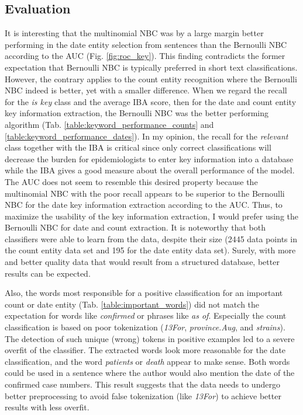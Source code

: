 \subsection{Evaluation}\label{eval_key}
  It is interesting that the multinomial NBC was by a large margin better performing in the date entity selection from sentences than the Bernoulli NBC according to the AUC (Fig. \ref{fig:roc_key}).
  This finding contradicts the former expectation that Bernoulli NBC is typically preferred in short text classifications.
  However, the contrary applies to the count entity recognition where the Bernoulli NBC indeed is better, yet with a smaller difference.
  When we regard the recall for the \textsl{is key} class and the average IBA score, then for the date and count entity key information extraction, the Bernoulli NBC was the better performing algorithm (Tab. \ref{table:keyword_performance_counts} and \ref{table:keyword_performance_dates}).
  In my opinion, the recall for the \textsl{relevant} class together with the IBA is critical since only correct classifications will decrease the burden for epidemiologists to enter key information into a database while the IBA gives a good measure about the overall performance of the model.
  The AUC does not seem to resemble this desired property because the multinomial NBC with the poor recall appears to be superior to the Bernoulli NBC for the date key information extraction according to the AUC.
  Thus, to maximize the usability of the key information extraction, I would prefer using the Bernoulli NBC for date and count extraction.
  It is noteworthy that both classifiers were able to learn from the data, despite their size (2445 data points in the count entity data set and 195 for the date entity data set).
  Surely, with more and better quality data that would result from a structured database, better results can be expected.

  Also, the words most responsible for a positive classification for an important count or date entity (Tab. \ref{table:important_words}) did not match the expectation for words like \textit{confirmed} or phrases like \textit{as of}.
  Especially the count classification is based on poor tokenization (\textit{13For}, \textit{province.Aug}, and \textit{strains}).
  The detection of such unique (wrong) tokens in positive examples led to a severe overfit of the classifier.
  The extracted words look more reasonable for the date classification, and the word \textit{patients} or \textit{death} appear to make sense.
  Both words could be used in a sentence where the author would also mention the date of the confirmed case numbers.
  This result suggests that the data needs to undergo better preprocessing to avoid false tokenization (like \textit{13For}) to achieve better results with less overfit.

